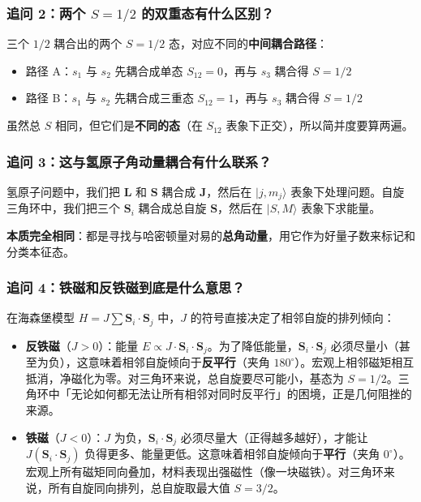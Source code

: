 \subsubsection*{追问 2：两个 $S=1/2$ 的双重态有什么区别？}

三个 $1/2$ 耦合出的两个 $S=1/2$ 态，对应不同的\textbf{中间耦合路径}：
\begin{itemize}[nosep]
    \item 路径 A：$s_1$ 与 $s_2$ 先耦合成单态 $S_{12}=0$，再与 $s_3$ 耦合得 $S=1/2$
    \item 路径 B：$s_1$ 与 $s_2$ 先耦合成三重态 $S_{12}=1$，再与 $s_3$ 耦合得 $S=1/2$
\end{itemize}
虽然总 $S$ 相同，但它们是\textbf{不同的态}（在 $S_{12}$ 表象下正交），所以简并度要算两遍。

\subsubsection*{追问 3：这与氢原子角动量耦合有什么联系？}

\begin{insightbox}[方法的统一性]
氢原子问题中，我们把 $\bm{L}$ 和 $\bm{S}$ 耦合成 $\bm{J}$，然后在 $|j, m_j\rangle$ 表象下处理问题。自旋三角环中，我们把三个 $\bm{S}_i$ 耦合成总自旋 $\bm{S}$，然后在 $|S, M\rangle$ 表象下求能量。

\textbf{本质完全相同}：都是寻找与哈密顿量对易的\textbf{总角动量}，用它作为好量子数来标记和分类本征态。
\end{insightbox}

\subsubsection*{追问 4：铁磁和反铁磁到底是什么意思？}

在海森堡模型 $H = J\sum \bm{S}_i \cdot \bm{S}_j$ 中，$J$ 的符号直接决定了相邻自旋的排列倾向：
\begin{itemize}[nosep]
    \item \textbf{反铁磁}（$J>0$）：能量 $E \propto J \cdot \bm{S}_i \cdot \bm{S}_j$。为了降低能量，$\bm{S}_i \cdot \bm{S}_j$ 必须尽量小（甚至为负），这意味着相邻自旋倾向于\textbf{反平行}（夹角 $180^\circ$）。宏观上相邻磁矩相互抵消，净磁化为零。对三角环来说，总自旋要尽可能小，基态为 $S=1/2$。三角环中「无论如何都无法让所有相邻对同时反平行」的困境，正是几何阻挫的来源。
    \item \textbf{铁磁}（$J<0$）：$J$ 为负，$\bm{S}_i \cdot \bm{S}_j$ 必须尽量大（正得越多越好），才能让 $J(\bm{S}_i \cdot \bm{S}_j)$ 负得更多、能量更低。这意味着相邻自旋倾向于\textbf{平行}（夹角 $0^\circ$）。宏观上所有磁矩同向叠加，材料表现出强磁性（像一块磁铁）。对三角环来说，所有自旋同向排列，总自旋取最大值 $S=3/2$。
\end{itemize}

